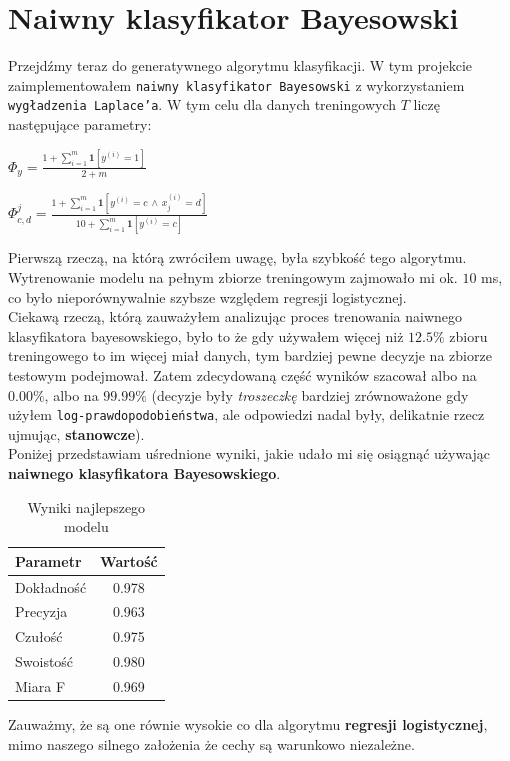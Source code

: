 \documentclass[polish,12pt,a4paper]{extarticle}
\begin{document}
\section*{Naiwny klasyfikator Bayesowski}
Przejdźmy teraz do generatywnego algorytmu klasyfikacji. W tym projekcie zaimplementowałem \texttt{naiwny klasyfikator Bayesowski} z wykorzystaniem \texttt{wygładzenia Laplace'a}. W tym celu dla danych treningowych $T$ liczę następujące parametry:
\begin{center}
    $\Phi_y = \frac{1 + \sum_{i=1}^m \mathbf{1}[y^{(i)} = 1]}{2 + m}$
\end{center}
\begin{center}
    $\Phi_{c, d}^j = \frac{1 + \sum_{i=1}^m \mathbf{1}[y^{(i)} = c \, \wedge \, x^{(i)}_j = d]}{10 + \sum_{i=1}^m \mathbf{1}[y^{(i)} = c]}$
\end{center}
Pierwszą rzeczą, na którą zwróciłem uwagę, była szybkość tego algorytmu. Wytrenowanie modelu na pełnym zbiorze treningowym zajmowało mi ok. $10$ ms, co było nieporównywalnie szybsze względem regresji logistycznej. \smallskip \\
Ciekawą rzeczą, którą zauważyłem analizując proces trenowania naiwnego klasyfikatora bayesowskiego, było to że gdy używałem więcej niż $12.5\%$ zbioru treningowego to im więcej miał danych, tym bardziej pewne decyzje na zbiorze testowym podejmował. Zatem zdecydowaną część wyników szacował albo na $0.00\%$, albo na $99.99\%$ (decyzje były \textit{troszeczkę} bardziej zrównoważone gdy użyłem \texttt{log-prawdopodobieństwa}, ale odpowiedzi nadal były, delikatnie rzecz ujmując, \textbf{stanowcze}). \smallskip \\
Poniżej przedstawiam uśrednione wyniki, jakie udało mi się osiągnąć używając \textbf{naiwnego klasyfikatora Bayesowskiego}. \\
\begin{table}[h!]
\centering
\begin{tabular}{|l|c|}
\hline
\textbf{Parametr}       & \textbf{Wartość} \\
\hline
Dokładność              & 0.978          \\
Precyzja             & 0.963          \\
Czułość           & 0.975          \\
Swoistość           & 0.980          \\
Miara F             & 0.969          \\
\hline
\end{tabular}
\caption{Wyniki najlepszego modelu}
\label{tab:performance_metrics}
\end{table} \FloatBarrier
Zauważmy, że są one równie wysokie co dla algorytmu \textbf{regresji logistycznej}, mimo naszego silnego założenia że cechy są warunkowo niezależne.
\end{document}
